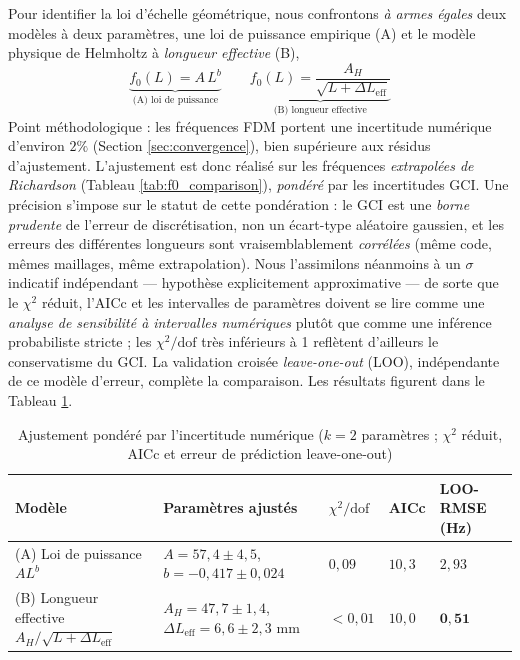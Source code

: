 \documentclass[11pt,a4paper,twocolumn]{article}
\begin{document}
Pour identifier la loi d'échelle géométrique, nous confrontons \emph{à armes égales} deux modèles à deux paramètres, une loi de puissance empirique (A) et le modèle physique de Helmholtz à \emph{longueur effective} (B),
\begin{equation}
\underbrace{f_0(L) = A\, L^b}_{\text{(A) loi de puissance}}
\qquad
\underbrace{f_0(L) = \frac{A_H}{\sqrt{L + \Delta L_{\mathrm{eff}}}}}_{\text{(B) longueur effective}}
\end{equation}
Point méthodologique : les fréquences FDM portent une incertitude numérique d'environ $2\%$ (Section \ref{sec:convergence}), bien supérieure aux résidus d'ajustement. L'ajustement est donc réalisé sur les fréquences \emph{extrapolées de Richardson} (Tableau \ref{tab:f0_comparison}), \emph{pondéré} par les incertitudes GCI. Une précision s'impose sur le statut de cette pondération : le GCI est une \emph{borne prudente} de l'erreur de discrétisation, non un écart-type aléatoire gaussien, et les erreurs des différentes longueurs sont vraisemblablement \emph{corrélées} (même code, mêmes maillages, même extrapolation). Nous l'assimilons néanmoins à un $\sigma$ indicatif indépendant — hypothèse explicitement approximative — de sorte que le $\chi^2$ réduit, l'AICc et les intervalles de paramètres doivent se lire comme une \emph{analyse de sensibilité à intervalles numériques} plutôt que comme une inférence probabiliste stricte ; les $\chi^2/\mathrm{dof}$ très inférieurs à 1 reflètent d'ailleurs le conservatisme du GCI. La validation croisée \emph{leave-one-out} (LOO), indépendante de ce modèle d'erreur, complète la comparaison. Les résultats figurent dans le Tableau \ref{tab:model_selection}.

\begin{table}[t]
\centering
\caption{Ajustement pondéré par l'incertitude numérique ($k=2$ paramètres ; $\chi^2$ réduit, AICc et erreur de prédiction leave-one-out)}
\label{tab:model_selection}
\begin{tabular}{>{\raggedright\arraybackslash}p{4.5cm}>{\centering\arraybackslash}p{5cm}>{\centering\arraybackslash}p{1.8cm}>{\centering\arraybackslash}p{1.6cm}>{\centering\arraybackslash}p{2.4cm}}
\toprule
Modèle & Paramètres ajustés & $\chi^2/\mathrm{dof}$ & AICc & LOO-RMSE (Hz) \\
\midrule
(A) Loi de puissance $A L^b$ & $A=57{,}4\pm4{,}5$, \; $b=-0{,}417\pm0{,}024$ & $0{,}09$ & $10{,}3$ & $2{,}93$ \\
(B) Longueur effective $A_H/\sqrt{L+\Delta L_{\mathrm{eff}}}$ & $A_H=47{,}7\pm1{,}4$, \; $\Delta L_{\mathrm{eff}}=6{,}6\pm2{,}3$ mm & $<0{,}01$ & $10{,}0$ & $\mathbf{0{,}51}$ \\
\bottomrule
\end{tabular}
\end{table}
\end{document}
